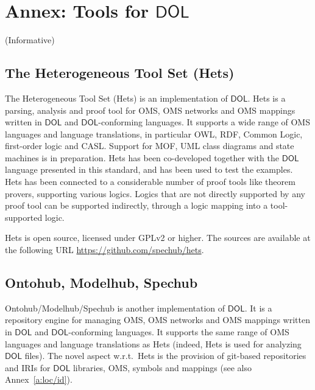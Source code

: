 \documentclass[10pt,fleqn,final]{scrreprt}
\makeatletter
\newcommand{\cbs}[0]{\color{red}\xspace} %
\newcommand{\cbe}[0]{\color{black}\xspace} %
\newcommand*\CommentAuthor{}
\renewcommand*\CommentAuthor{#1}}
\newcommand*\CommentDate{}
\renewcommand*\CommentDate{#1}}
\newcommand*\CommentId{}
\renewcommand*\CommentId{#1}}
\newcommand*\CommentType{}
\renewcommand*\CommentType{#1}}
\newcommand*{\SetCommentColorByType}[1]{%
\edef\localType{{#1}}%
\expandafter\ifstrequal\localType{q-aut}{\colorlet{CommentColor}{red}}{%
\expandafter\ifstrequal\localType{q-all}{\colorlet{CommentColor}{orange}}{%
\expandafter\ifstrequal\localType{todo}{\colorlet{CommentColor}{orange}}{%
\expandafter\ifstrequal\localType{fyi}{\colorlet{CommentColor}{lightgray}}{%
\colorlet{CommentColor}{yellow}}}}}}
\newcommand*{\SetCommentPrefixByType}[1]{%
\edef\localType{{#1}}%
\expandafter\@ifmtarg\localType{%
\edef\CommentPrefix{}%
}{%
\caseupper[q]{#1}%
\edef\CommentPrefix{\thestring: }%
}}
\newcommand*{\initComment}[1]{%
\setkeys{Comment}{#1}%
\SetCommentColorByType{\CommentType}%
\relax%
\SetCommentPrefixByType{\CommentType}%
\relax%
}
\newcommand*{\todonote}[2][]{%
\initComment{#1}%
\pdfcomment[author=\CommentAuthor,color=CommentColor,date=\CommentDate,id=\CommentId]{%
\CommentPrefix
#2}}
\renewcommand*{\todonote}[2][]{%
\initComment{#1}%
\ednote{\CommentPrefix #2}}
\newcommand*{\DOL}{\ensuremath{\mathsf{DOL}}\xspace}
\newcommand{\informative}[0]{{\begin{center}{\Large{(Informative})}\end{center}} \bigskip}
\newcommand{\sclause}[1]{\section{#1}}
\newcommand{\infannex}[1]{ \chapter{Annex: #1}  \informative }
\makeatother
\begin{document}





\infannex{Tools for \DOL}\label{a:tools}

\sclause{The Heterogeneous Tool Set (Hets)}\label{a:hets} The
Heterogeneous Tool Set (Hets) is \cbs an implementation \cbe of
\DOL. Hets\cbs is\cbe a parsing, analysis and proof tool
for OMS, OMS networks and OMS mappings written in \DOL and
\DOL-conforming languages.  It supports a wide range of OMS languages
and language translations, in particular OWL, RDF, Common Logic,
first-order logic and CASL. Support for MOF, UML class diagrams and
state machines is in preparation.  Hets has been co-developed together
with the \DOL language presented in this standard, and has been used to
test the examples. Hets has been connected to\cbs a\cbe considerable number of
proof tools like theorem provers, supporting various logics. Logics
that are not directly supported by any proof tool can be supported
indirectly, through a logic mapping into a tool-supported logic.

Hets  is open source, licensed under GPLv2 or higher. The sources are
available at the following URL \url{https://github.com/spechub/hets}.


\sclause{Ontohub, Modelhub, Spechub}\label{a:ontohub}

Ontohub/Modelhub/Spechub is \cbs another implementation \cbe of
\DOL. It is a repository engine for managing OMS, OMS networks and OMS
mappings written in \DOL and \DOL-conforming languages.  It supports the
same range of OMS languages and language translations as Hets (indeed,
Hets is used for analyzing \DOL files). The novel aspect w.r.t.\ Hets
is the provision of git-based repositories and IRIs for \DOL libraries,
OMS, symbols and mappings (see also Annex~\ref{a:loc/id}).
\end{document}
